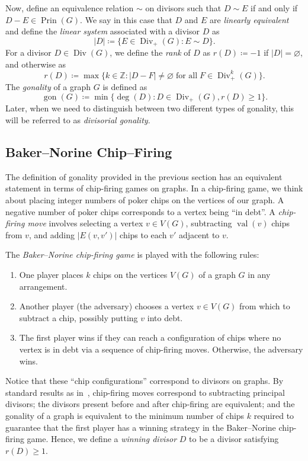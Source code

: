 \documentclass[ALCO,ThmDefs,Unicode,epreuves]{cedram}
\DeclareMathOperator{\gon}{gon}
\DeclareMathOperator{\val}{val}
\DeclareMathOperator{\Div}{Div}
\DeclareMathOperator{\Prin}{Prin}
\begin{document}
Now, define an equivalence relation $\sim$ on divisors such that $D \sim E$ if and only if $D - E \in \Prin (G)$. We say in this case that $D$ and $E$ are \emph{linearly equivalent} and define the \emph{linear system} associated with a divisor $D$ as
\[
|D| \coloneqq \{ E \in \Div _+(G) : E \sim D \}.
\]
For a divisor $D \in \Div (G)$, we define the \emph{rank} of $D$ as $r(D) \coloneqq -1$ if $|D| = \varnothing$, and otherwise as
\[
r(D) \coloneqq \max \{ k \in \mathbb{Z} : |D - F| \neq \varnothing \; \text{for all} \; F \in \Div _+^k(G) \}.
\]
The \emph{gonality} of a graph $G$ is defined as
\[
\gon (G) \coloneqq \min \{ \deg (D) : D \in \Div _+(G), r(D) \geq 1 \}.
\] Later, when we need to distinguish between two different types of gonality, this will be referred to as \emph{divisorial gonality}.

\subsection{Baker--Norine Chip--Firing}

The definition of gonality provided in the previous section has an equivalent statement in terms of chip-firing games on graphs. In a chip-firing game, we think about placing integer numbers of poker chips on the vertices of our graph. A negative number of poker chips corresponds to a vertex being ``in debt''. A \emph{chip-firing move} involves selecting a vertex $v \in V(G)$, subtracting $\val (v)$ chips from $v$, and adding $|E(v,v')|$ chips to each $v'$ adjacent to $v$.

The \emph{Baker--Norine chip-firing game} is played with the following rules:

\begin{enumerate}
 \item\label{sect2.2_1} One player places $k$ chips on the vertices $V(G)$ of a graph $G$ in any arrangement.
 \item\label{sect2.2_2} Another player (the adversary) chooses a vertex $v \in V(G)$ from which to subtract a chip, possibly putting $v$ into debt.
 \item\label{sect2.2_3} The first player wins if they can reach a configuration of chips where no vertex is in debt via a sequence of chip-firing moves. Otherwise, the adversary wins.
\end{enumerate}

Notice that these ``chip configurations'' correspond to divisors on graphs. By standard results as in~\cite{bn}, chip-firing moves correspond to subtracting principal divisors; the divisors present before and after chip-firing are equivalent; and the gonality of a graph is equivalent to the minimum number of chips $k$ required to guarantee that the first player has a winning strategy in the Baker--Norine chip-firing game. Hence, we define a \emph{winning divisor} $D$ to be a divisor satisfying $r(D) \geq 1$. 
\end{document}
